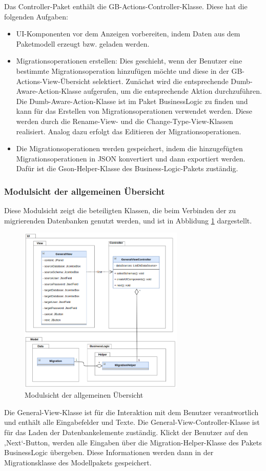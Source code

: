 	Das Controller-Paket enthält die GB-Actions-Controller-Klasse. Diese hat die folgenden Aufgaben:
	\begin{itemize}
		\item UI-Komponenten vor dem Anzeigen vorbereiten, indem Daten aus dem Paketmodell erzeugt bzw. geladen werden.
		\item Migrationsoperationen erstellen: Dies geschieht, wenn der Benutzer eine bestimmte Migrationsoperation hinzufügen möchte und diese in der GB-Actions-View-Übersicht selektiert. Zunächst wird die entsprechende Dumb-Aware-Action-Klasse aufgerufen, um die entsprechende Aktion durchzuführen. Die Dumb-Aware-Action-Klasse ist im Paket BusinessLogic zu finden und kann für das Erstellen von Migrationsoperationen verwendet werden. Diese werden durch die Rename-View- und die Change-Type-View-Klassen realisiert. Analog dazu erfolgt das Editieren der Migrationsoperationen.
		\item Die Migrationsoperationen werden gespeichert, indem die hinzugefügten Migrationsoperationen in JSON konvertiert und dann exportiert werden. Dafür ist die Gson-Helper-Klasse des Business-Logic-Pakets zuständig.
	\end{itemize}
	
	
	
	\subsubsection{Modulsicht der allgemeinen Übersicht}
	Diese Modulsicht zeigt die beteiligten Klassen, die beim Verbinden der zu migrierenden Datenbanken genutzt werden, und ist in Abblidung \ref{img:modulsicht-general} dargestellt. 
	\begin{figure}[H]
		\centering
		\includegraphics[width=0.7\textwidth]{images/sichten/modulsicht-general}
		\caption{Modulsicht der allgemeinen Übersicht}
		\label{img:modulsicht-general}
	\end{figure}
	Die General-View-Klasse ist für die Interaktion mit dem Benutzer verantwortlich und enthält alle Eingabefelder und Texte. Die General-View-Controller-Klasse ist für das Laden der Datenbankelemente zuständig. Klickt der Benutzer auf den ‚Next‘-Button, werden alle Eingaben über die Migration-Helper-Klasse des Pakets BusinessLogic übergeben. Diese Informationen werden dann in der Migrationsklasse des Modellpakets gespeichert.
	
